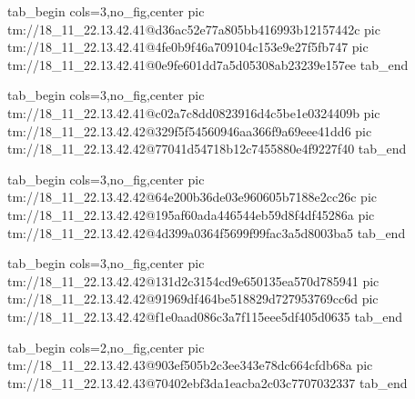  
 
 
 
 

\qqSecCmtScr


\ifcmt
  tab_begin cols=3,no_fig,center
    pic tm://18_11_22.13.42.41@d36ac52e77a805bb416993b12157442c
    pic tm://18_11_22.13.42.41@4fe0b9f46a709104c153e9e27f5fb747
    pic tm://18_11_22.13.42.41@0e9fe601dd7a5d05308ab23239e157ee
  tab_end
\fi


\ifcmt
  tab_begin cols=3,no_fig,center
    pic tm://18_11_22.13.42.41@c02a7c8dd0823916d4c5be1e0324409b
    pic tm://18_11_22.13.42.42@329f5f54560946aa366f9a69eee41dd6
    pic tm://18_11_22.13.42.42@77041d54718b12c7455880e4f9227f40
  tab_end
\fi


\ifcmt
  tab_begin cols=3,no_fig,center
    pic tm://18_11_22.13.42.42@64e200b36de03e960605b7188e2cc26c
    pic tm://18_11_22.13.42.42@195af60ada446544eb59d8f4df45286a
    pic tm://18_11_22.13.42.42@4d399a0364f5699f99fac3a5d8003ba5
  tab_end
\fi


\ifcmt
  tab_begin cols=3,no_fig,center
    pic tm://18_11_22.13.42.42@131d2c3154cd9e650135ea570d785941
    pic tm://18_11_22.13.42.42@91969df464be518829d727953769cc6d
    pic tm://18_11_22.13.42.42@f1e0aad086c3a7f115eee5df405d0635
  tab_end
\fi


\ifcmt
  tab_begin cols=2,no_fig,center
    pic tm://18_11_22.13.42.43@903ef505b2c3ee343e78dc664cfdb68a
    pic tm://18_11_22.13.42.43@70402ebf3da1eacba2c03c7707032337
  tab_end
\fi

